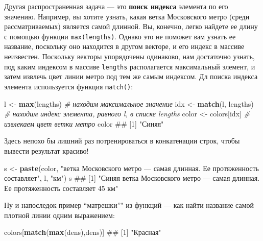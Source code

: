 \documentclass[]{book}
\newenvironment{Shaded}{\begin{snugshade}}{\end{snugshade}}
\newcommand{\KeywordTok}[1]{\textcolor[rgb]{0.13,0.29,0.53}{\textbf{#1}}}
\newcommand{\StringTok}[1]{\textcolor[rgb]{0.31,0.60,0.02}{#1}}
\newcommand{\CommentTok}[1]{\textcolor[rgb]{0.56,0.35,0.01}{\textit{#1}}}
\newcommand{\NormalTok}[1]{#1}
\begin{document}
Другая распространенная задача --- это \textbf{поиск индекса} элемента
по его значению. Например, вы хотите узнать, какая ветка Московского
метро (среди рассматриваемых) является самой длинной. Вы, конечно, легко
найдете ее длину с помощью функции \texttt{max(lengths)}. Однако это не
поможет вам узнать ее название, поскольку оно находится в другом
векторе, и его индекс в массиве неизвестен. Поскольку векторы
упорядочены одинаково, нам достаточно узнать, под каким индексом в
массиве \texttt{lengths} располагается максимальный элемент, и затем
извлечь цвет линии метро под тем же самым индексом. Дл поиска индекса
элемента используется функция \texttt{match()}:

\begin{Shaded}
\begin{Highlighting}[]
\NormalTok{l <-}\StringTok{ }\KeywordTok{max}\NormalTok{(lengths) }\CommentTok{# находим максимальное значение}
\NormalTok{idx <-}\StringTok{ }\KeywordTok{match}\NormalTok{(l, lengths) }\CommentTok{# находим индекс элемента, равного l, в списке lengths}
\NormalTok{color <-}\StringTok{ }\NormalTok{colors[idx] }\CommentTok{# извлекаем цвет ветки метро}
\NormalTok{color}
\NormalTok{## [1] "Синяя"}
\end{Highlighting}
\end{Shaded}

Здесь непохо бы лишний раз потренироваться в конкатенации строк, чтобы
вывести результат красиво!

\begin{Shaded}
\begin{Highlighting}[]
\NormalTok{s <-}\StringTok{ }\KeywordTok{paste}\NormalTok{(color, }\StringTok{"ветка Московского метро — самая длинная. Ее протяженность составляет"}\NormalTok{, l, }\StringTok{"км"}\NormalTok{)}
\NormalTok{s}
\NormalTok{## [1] "Синяя ветка Московского метро — самая длинная. Ее протяженность составляет 45 км"}
\end{Highlighting}
\end{Shaded}

Ну и напоследок пример ``матрешки''" из функций --- как найти название
самой плотной линии одним выражением:

\begin{Shaded}
\begin{Highlighting}[]
\NormalTok{colors[}\KeywordTok{match}\NormalTok{(}\KeywordTok{max}\NormalTok{(dens),dens)]}
\NormalTok{## [1] "Красная"}
\end{Highlighting}
\end{Shaded}
\end{document}

